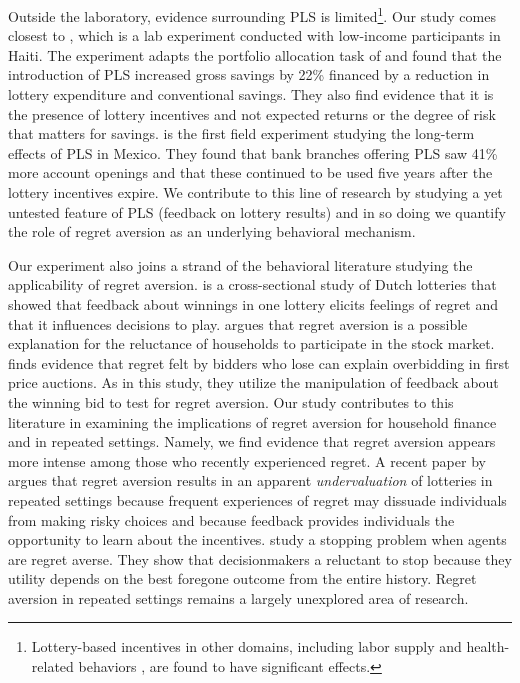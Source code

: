 \documentclass[12pt, titlepage]{article}
\begin{document}
	Outside the laboratory, evidence surrounding PLS is limited\footnote{Lottery-based incentives in other domains, including labor supply \parencite{brune_effect_2015} and health-related behaviors \parencite{kimmel_randomized_2012,bjorkman_nyqvist_using_2015}, are found to have significant effects.}. Our study comes closest to \textcite{dizon_leveraging_2016}, which is a lab experiment conducted with low-income participants in Haiti. The experiment adapts the portfolio allocation task of \textcite{atalay_savings_2014} and found that the introduction of PLS increased gross savings by 22\% financed by a reduction in lottery expenditure and conventional savings. They also find evidence that it is the presence of lottery incentives and not expected returns or the degree of risk that matters for savings. \textcite{gertler_long-term_2017} is the first field experiment studying the long-term effects of PLS in Mexico. They found that bank branches offering PLS saw 41\% more account openings and that these continued to be used five years after the lottery incentives expire. We contribute to this line of research by studying a yet untested feature of PLS (feedback on lottery results) and in so doing we quantify the role of regret aversion as an underlying behavioral mechanism.

	Our experiment also joins a strand of the behavioral literature studying the applicability of regret aversion. \textcite{zeelenberg_consequences_2004} is a cross-sectional study of Dutch lotteries that showed that feedback about winnings in one lottery elicits feelings of regret and that it influences decisions to play. \textcite{barberis_individual_2006} argues that regret aversion is a possible explanation for the reluctance of households to participate in the stock market. \textcite{filiz-ozbay_auctions_2007} finds evidence that regret felt by bidders who lose can explain overbidding in first price auctions. As in this study, they utilize the manipulation of feedback about the winning bid to test for regret aversion. Our study contributes to this literature in examining the implications of regret aversion for household finance and in repeated settings. Namely, we find evidence that regret aversion appears more intense among those who recently experienced regret. A recent paper by \textcite{imas_regret_2016} argues that regret aversion results in an apparent \emph{undervaluation} of lotteries in repeated settings because frequent experiences of regret may dissuade individuals from making risky choices and because feedback provides individuals the opportunity to learn about the incentives. \textcite{strack_too_2019} study a stopping problem when agents are regret averse. They show that decisionmakers a reluctant to stop because they utility depends on the best foregone outcome from the entire history. Regret aversion in repeated settings remains a largely unexplored area of research.
\end{document}
